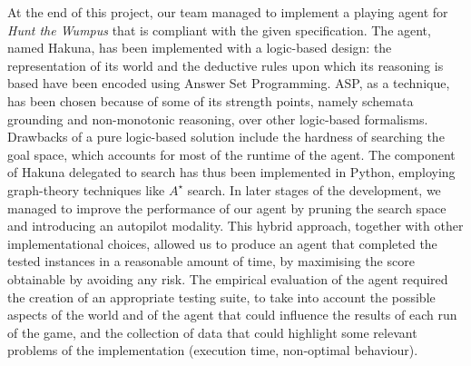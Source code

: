 \documentclass{llncs}
\newcommand{\htw}{\emph{Hunt the Wumpus }}
\begin{document}
At the end of this project, our team managed to implement a playing agent for \htw that is compliant with the given specification.
The agent, named Hakuna, has been implemented with a logic-based design: the representation of its world and the deductive rules upon which its reasoning is based have been encoded using Answer Set Programming.
ASP, as a technique, has been chosen because of some of its strength points, namely schemata grounding and non-monotonic reasoning, over other logic-based formalisms.
Drawbacks of a pure logic-based solution include the hardness of searching the goal space, which accounts for most of the runtime of the agent.
The component of Hakuna delegated to search has thus been implemented in Python, employing graph-theory techniques like $A^{\star}$ search.
In later stages of the development, we managed to improve the performance of our agent by pruning the search space and introducing an autopilot modality.
This hybrid approach, together with other implementational choices, allowed us to produce an agent that completed the tested instances in a reasonable amount of time, by maximising the score obtainable by avoiding any risk.
The empirical evaluation of the agent required the creation of an appropriate testing suite, to take into account the possible aspects of the world and of the agent that could influence the results of each run of the game, and the collection of data that could highlight some relevant problems of the implementation (execution time, non-optimal behaviour).
\end{document}
